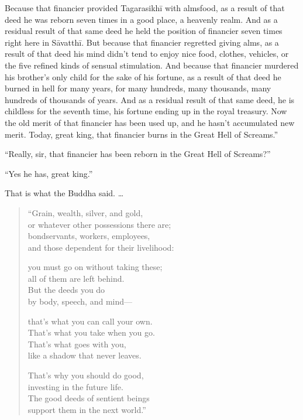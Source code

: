 \documentclass[12pt,openany]{book}%
\begin{document}
Because that financier provided \textsanskrit{Tagarasikhī} with almsfood, as a result of that deed he was reborn seven times in a good place, a heavenly realm. And as a residual result of that same deed he held the position of financier seven times right here in \textsanskrit{Sāvatthī}. But because that financier regretted giving alms, as a result of that deed his mind didn’t tend to enjoy nice food, clothes, vehicles, or the five refined kinds of sensual stimulation. And because that financier murdered his brother’s only child for the sake of his fortune, as a result of that deed he burned in hell for many years, for many hundreds, many thousands, many hundreds of thousands of years. And as a residual result of that same deed, he is childless for the seventh time, his fortune ending up in the royal treasury. Now the old merit of that financier has been used up, and he hasn’t accumulated new merit. Today, great king, that financier burns in the Great Hell of Screams.” 

“Really, sir, that financier has been reborn in the Great Hell of Screams?” 

“Yes he has, great king.” 

That is what the Buddha said. … 

\begin{verse}%
“Grain, wealth, silver, and gold, \\
or whatever other possessions there are; \\
bondservants, workers, employees, \\
and those dependent for their livelihood: 

you must go on without taking these; \\
all of them are left behind. \\
But the deeds you do \\
by body, speech, and mind—

that’s what you can call your own. \\
That’s what you take when you go. \\
That’s what goes with you, \\
like a shadow that never leaves. 

That’s why you should do good, \\
investing in the future life. \\
The good deeds of sentient beings \\
support them in the next world.” 

%
\end{verse}
\end{document}
